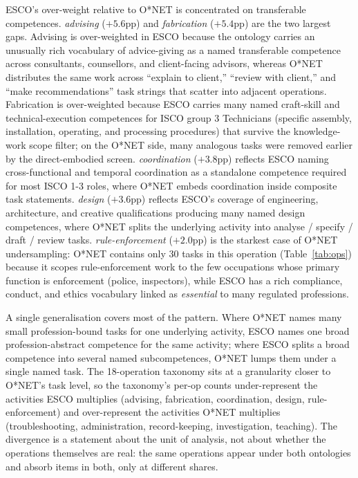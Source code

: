 \documentclass{article}
\begin{document}
ESCO's over-weight relative to O{*}NET is concentrated on transferable competences.
\emph{advising} ($+5.6$pp) and \emph{fabrication} ($+5.4$pp) are the two largest gaps.
Advising is over-weighted in ESCO because the ontology carries an unusually rich vocabulary of advice-giving as a named transferable competence across consultants, counsellors, and client-facing advisors, whereas O{*}NET distributes the same work across ``explain to client,'' ``review with client,'' and ``make recommendations'' task strings that scatter into adjacent operations.
Fabrication is over-weighted because ESCO carries many named craft-skill and technical-execution competences for ISCO group 3 Technicians (specific assembly, installation, operating, and processing procedures) that survive the knowledge-work scope filter; on the O{*}NET side, many analogous tasks were removed earlier by the direct-embodied screen.
\emph{coordination} ($+3.8$pp) reflects ESCO naming cross-functional and temporal coordination as a standalone competence required for most ISCO 1-3 roles, where O{*}NET embeds coordination inside composite task statements.
\emph{design} ($+3.6$pp) reflects ESCO's coverage of engineering, architecture, and creative qualifications producing many named design competences, where O{*}NET splits the underlying activity into analyse / specify / draft / review tasks.
\emph{rule-enforcement} ($+2.0$pp) is the starkest case of O{*}NET undersampling: O{*}NET contains only 30 tasks in this operation (Table~\ref{tab:ops}) because it scopes rule-enforcement work to the few occupations whose primary function is enforcement (police, inspectors), while ESCO has a rich compliance, conduct, and ethics vocabulary linked as \emph{essential} to many regulated professions.

A single generalisation covers most of the pattern.
Where O{*}NET names many small profession-bound tasks for one underlying activity, ESCO names one broad profession-abstract competence for the same activity; where ESCO splits a broad competence into several named subcompetences, O{*}NET lumps them under a single named task.
The 18-operation taxonomy sits at a granularity closer to O{*}NET's task level, so the taxonomy's per-op counts under-represent the activities ESCO multiplies (advising, fabrication, coordination, design, rule-enforcement) and over-represent the activities O{*}NET multiplies (troubleshooting, administration, record-keeping, investigation, teaching).
The divergence is a statement about the unit of analysis, not about whether the operations themselves are real: the same operations appear under both ontologies and absorb items in both, only at different shares.
\end{document}

